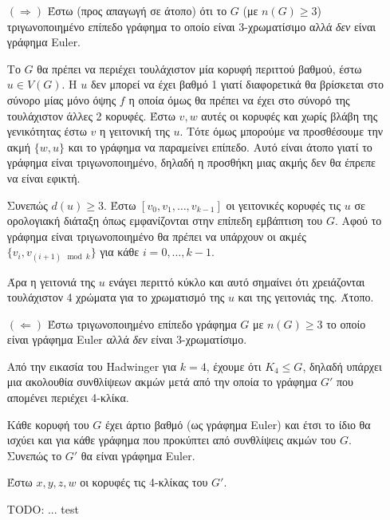 \documentclass[a4paper, oneside, 11pt]{article}
\theoremstyle{definition}
\begin{document}
\begin{enumerate}
   \begin{itemize}
      \item[$(\Rightarrow)$]
         Έστω (προς απαγωγή σε άτοπο) ότι το $G$ (με $n(G) \geq 3$)
         τριγωνοποιημένο επίπεδο γράφημα το οποίο είναι 3-χρωματίσιμο
         αλλά \emph{δεν} είναι γράφημα Euler.

         Το $G$ θα πρέπει να περιέχει τουλάχιστον μία κορυφή περιττού
         βαθμού, έστω $u \in V(G)$. Η $u$ δεν μπορεί να έχει βαθμό 1
         γιατί διαφορετικά θα βρίσκεται στο σύνορο μίας μόνο
         όψης $f$ η οποία όμως θα πρέπει να έχει στο σύνορό της τουλάχιστον
         άλλες 2 κορυφές. Έστω $v, w$ αυτές οι κορυφές και χωρίς βλάβη της
         γενικότητας έστω $v$ η γειτονική της $u$. Τότε όμως μπορούμε
         να προσθέσουμε την ακμή $\{w, u\}$ και το γράφημα να παραμείνει
         επίπεδο. Αυτό είναι άτοπο γιατί το γράφημα είναι τριγωνοποιημένο,
         δηλαδή η προσθήκη μιας ακμής δεν θα έπρεπε να είναι εφικτή.

         Συνεπώς $d(u) \geq 3$. Έστω $[v_0, v_1, \ldots, v_{k-1}]$
         οι γειτονικές
         κορυφές τις $u$ σε ορολογιακή διάταξη όπως εμφανίζονται στην
         επίπεδη εμβάπτιση του $G$. Αφού το γράφημα είναι τριγωνοποιημένο
         θα πρέπει να υπάρχουν οι ακμές $\{v_i, v_{(i+1) \mod k}\}$ για κάθε
         $i = 0, \ldots, k-1$.

         Άρα η γειτονιά της $u$ ενάγει περιττό κύκλο και αυτό σημαίνει
         ότι χρειάζονται τουλάχιστον 4 χρώματα για το χρωματισμό
         της $u$ και της γειτονιάς της. Άτοπο.

      \item[$(\Leftarrow)$]
         Έστω τριγωνοποιημένο επίπεδο γράφημα $G$ με $n(G) \geq 3$
         το οποίο είναι γράφημα Euler αλλά \emph{δεν} είναι
         3-χρωματίσιμο.

         Από την εικασία του Hadwinger για $k=4$, έχουμε ότι
         $K_4 \leq G$, δηλαδή υπάρχει μια ακολουθία συνθλίψεων
         ακμών μετά από την οποία το γράφημα $G'$ που απομένει
         περιέχει 4-κλίκα.

         Κάθε κορυφή του $G$ έχει άρτιο βαθμό (ως γράφημα Euler) και
         έτσι το ίδιο θα ισχύει και για κάθε γράφημα που προκύπτει
         από συνθλίψεις ακμών του $G$. Συνεπώς το $G'$ θα είναι
         γράφημα Euler.

         Έστω $x, y, z, w$ οι κορυφές τις 4-κλίκας του $G'$.

         TODO: ... test
   \end{itemize}
\end{enumerate}
\end{document}
